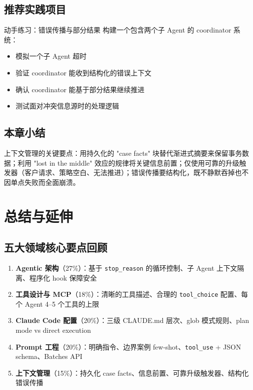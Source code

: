 \documentclass[a4paper]{article}
\begin{document}
\subsection{推荐实践项目}

\begin{knowledgebox}{动手练习：错误传播与部分结果}
构建一个包含两个子 Agent 的 coordinator 系统：
\begin{itemize}[leftmargin=1.5em]
    \item 模拟一个子 Agent 超时
    \item 验证 coordinator 能收到结构化的错误上下文
    \item 确认 coordinator 能基于部分结果继续推进
    \item 测试面对冲突信息源时的处理逻辑
\end{itemize}
\end{knowledgebox}

\subsection{本章小结}

上下文管理的关键要点：用持久化的 "case facts" 块替代渐进式摘要来保留事务数据；利用 "lost in the middle" 效应的规律将关键信息前置；仅使用可靠的升级触发器（客户请求、策略空白、无法推进）；错误传播要结构化，既不静默吞掉也不因单点失败而全面崩溃。

\section{总结与延伸}

\subsection{五大领域核心要点回顾}

\begin{enumerate}[leftmargin=1.5em]
    \item \textbf{Agentic 架构}（27\%）：基于 \texttt{stop\_reason} 的循环控制、子 Agent 上下文隔离、程序化 hook 保障安全
    \item \textbf{工具设计与 MCP}（18\%）：清晰的工具描述、合理的 \texttt{tool\_choice} 配置、每个 Agent 4--5 个工具的上限
    \item \textbf{Claude Code 配置}（20\%）：三级 CLAUDE.md 层次、glob 模式规则、plan mode vs direct execution
    \item \textbf{Prompt 工程}（20\%）：明确指令、边界案例 few-shot、\texttt{tool\_use} + JSON schema、Batches API
    \item \textbf{上下文管理}（15\%）：持久化 case facts、信息前置、可靠升级触发器、结构化错误传播
\end{enumerate}
\end{document}
